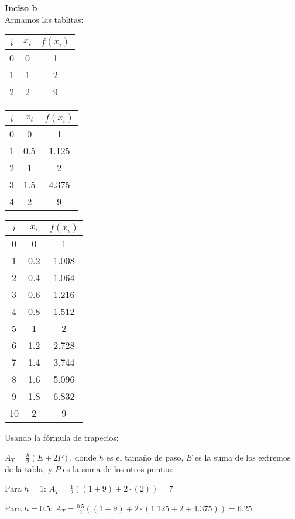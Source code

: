 \documentclass[11pt]{article}
\begin{document}
	\textbf{Inciso b}\\	
	Armamos las tablitas:
	
	\begin{tabular}{|c|c|c|}
		\hline
		$i$ & $x_i$ & $f(x_i)$ \\
		\hline
		0 & 0 & 1 \\
		\hline
		1 & 1 & 2 \\
		\hline
		2 & 2 & 9 \\
		\hline
	\end{tabular}
	\hspace{2cm}
	\begin{tabular}{|c|c|c|}
		\hline
		$i$ & $x_i$ & $f(x_i)$ \\
		\hline
		0 & 0 & 1 \\
		\hline
		1 & 0.5 & 1.125 \\
		\hline
		2 & 1 & 2 \\
		\hline
		3 & 1.5 & 4.375 \\
		\hline
		4 & 2 & 9 \\
		\hline
	\end{tabular}
	\hspace{2cm}
	\begin{tabular}{|c|c|c|}
		\hline
		$i$ & $x_i$ & $f(x_i)$ \\
		\hline
		0 & 0 & 1 \\
		\hline
		1 & 0.2 & 1.008 \\
		\hline
		2 & 0.4 & 1.064 \\
		\hline
		3 & 0.6 & 1.216 \\
		\hline
		4 & 0.8 & 1.512 \\
		\hline
		5 & 1 & 2 \\
		\hline
		6 & 1.2 & 2.728 \\
		\hline
		7 & 1.4 & 3.744 \\
		\hline
		8 & 1.6 & 5.096 \\
		\hline
		9 & 1.8 & 6.832 \\
		\hline
		10 & 2 & 9 \\
		\hline
	\end{tabular}

	Usando la fórmula de trapecios:
	
	$\displaystyle A_T=\frac{h}{2}(E+2P)$, donde $h$ es el tamaño de paso, $E$ es la suma de los extremos de la tabla, y $P$ es la suma de los otros puntos:
	
	Para $h=1$: $\displaystyle A_T=\frac{1}{2}((1+9)+2\cdot(2))=7$
	
	Para $h=0.5$: $\displaystyle A_T=\frac{0.5}{2}((1+9)+2\cdot(1.125+2+4.375))=6.25$
	
\end{document}
